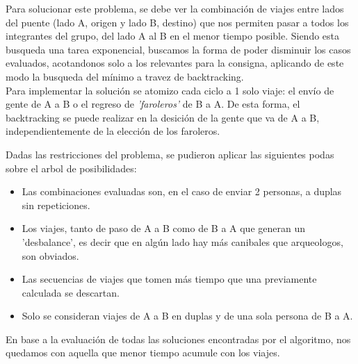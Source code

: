Para solucionar este problema, se debe ver la combinaci\'on de viajes entre lados del puente (lado A, origen y lado B, destino) que nos permiten pasar a todos los integrantes
del grupo, del lado A al B en el menor tiempo posible. Siendo esta busqueda una tarea exponencial, buscamos la forma de poder disminuir los casos evaluados, acotandonos solo a los relevantes
para la consigna, aplicando de este modo la busqueda del m\'inimo a travez de backtracking.\\


Para implementar la solución se atomizo cada ciclo a 1 solo viaje: el env\'io de gente de A a B o el regreso de \textit{'faroleros'} de B a A. De esta forma, el backtracking se puede realizar en 
la desición de la gente que va de A a B, independientemente de la elección de los faroleros.

Dadas las restricciones del problema, se pudieron aplicar las siguientes podas sobre el arbol de posibilidades:
\begin{itemize}
	\item Las combinaciones evaluadas son, en el caso de enviar 2 personas, a duplas sin repeticiones.
	\item Los viajes, tanto de paso de A a B como de B a A que generan un 'desbalance', es decir que en alg\'un lado hay más canibales que arqueologos, son obviados.
	\item Las secuencias de viajes que tomen más tiempo que una previamente calculada se descartan.
	\item Solo se consideran viajes de A a B en duplas y de una sola persona de B a A.
\end{itemize}

En base a la evaluación de todas las soluciones encontradas por el algoritmo, nos quedamos con aquella que menor tiempo acumule con los viajes.